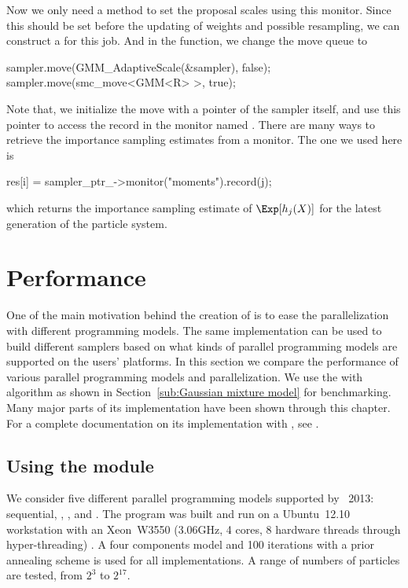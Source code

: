 Now we only need a method to set the proposal scales using this monitor. Since this should be set before the updating of weights and possible resampling, we can construct a  for this job.
And in the  function, we change the move queue to
\begin{cppcode}
sampler.move(GMM_AdaptiveScale(&sampler), false);
sampler.move(smc_move<GMM<R> >, true);
\end{cppcode}
Note that, we initialize the move with a pointer of the sampler itself, and use this pointer to access the record in the monitor named . There are many ways to retrieve the importance sampling estimates from a monitor. The one we used here is
\begin{cppcode}
res[i] = sampler_ptr_->monitor("moments").record(j);
\end{cppcode}
which returns the importance sampling estimate of $\Exp[h_j(X)]$ for the latest generation of the particle system.

\section{Performance}
\label{sec:vSMC Performance}

One of the main motivation behind the creation of \vsmc is to ease the parallelization with different programming models. The same implementation can be used to build different samplers based on what kinds of parallel programming models are supported on the users' platforms. In this section we compare the performance of various \smp parallel programming models and \opencl parallelization. We use the \gmm with \smc[2] algorithm as shown in Section~\ref{sub:Gaussian mixture model} for benchmarking. Many major parts of its implementation have been shown through this chapter. For a complete documentation on its implementation with \vsmc, see \cite{vsmcjss}.

\subsection{Using the \protect\smp module}
\label{sub:Using the SMP module}

We consider five different parallel programming models supported by \icpc~2013: sequential, \tbb, \cilk, \openmp and \cppoo{} . The program was built and run on a Ubuntu~12.10 workstation with an Xeon~W3550 (3.06GHz, 4 cores, 8 hardware threads through hyper-threading) \cpu. A four components model and 100 iterations with a prior annealing scheme is used for all implementations. A range of numbers of particles are tested, from $2^3$ to $2^{17}$.

